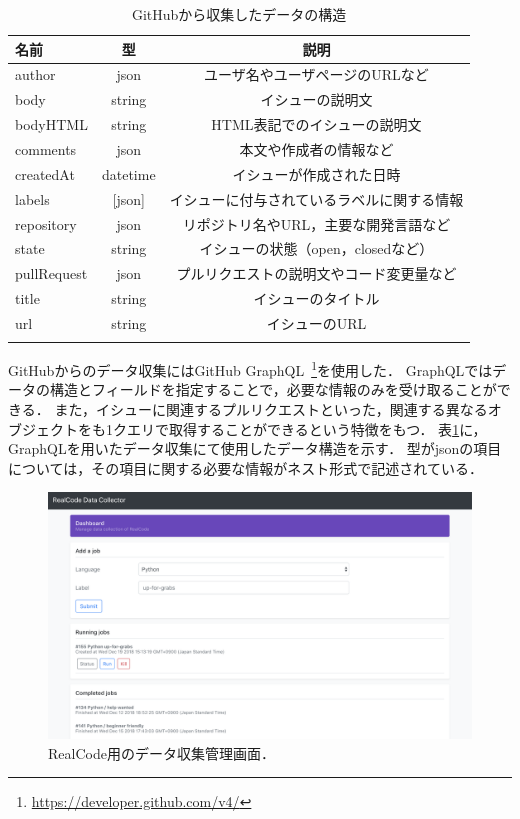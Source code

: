 
\begin{table}[t]

  \centering
  \caption{GitHubから収集したデータの構造}
  \label{table:format_collected_GH_data}
    
  \begin{tabular}{l | c | c } \Xhline{3\arrayrulewidth}
      名前 & 型 & 説明 \\ \hline \hline
      author & json & ユーザ名やユーザページのURLなど\\
      body & string & イシューの説明文  \\
      bodyHTML & string & HTML表記でのイシューの説明文 \\
      comments & json & 本文や作成者の情報など \\
      createdAt & datetime & イシューが作成された日時 \\
      labels & [json] & イシューに付与されているラベルに関する情報 \\
      repository & json & リポジトリ名やURL，主要な開発言語など\\  
      state & string & イシューの状態（open，closedなど） \\
      pullRequest & json & プルリクエストの説明文やコード変更量など \\
      title & string & イシューのタイトル \\
      url & string & イシューのURL \\
      
      \Xhline{3\arrayrulewidth}
  \end{tabular}
\end{table}

GitHubからのデータ収集にはGitHub GraphQL~\footnote{\url{https://developer.github.com/v4/}}を使用した．
GraphQLではデータの構造とフィールドを指定することで，必要な情報のみを受け取ることができる．
また，イシューに関連するプルリクエストといった，関連する異なるオブジェクトをも1クエリで取得することができるという特徴をもつ．
表\ref{table:format_collected_GH_data}に，GraphQLを用いたデータ収集にて使用したデータ構造を示す．
型がjsonの項目については，その項目に関する必要な情報がネスト形式で記述されている．

\begin{figure}[t]
  \centering
  \includegraphics[width=1.0\columnwidth]{realcode-data-collector-screenshot.png}
  \caption{RealCode用のデータ収集管理画面．}
  \label{fig:realcode-data-collector}
\end{figure}

